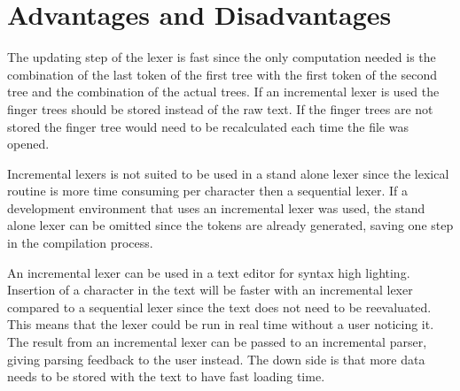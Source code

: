 \section{Advantages and Disadvantages}
The updating step of the lexer is fast since the only computation needed is the
combination of the last token of the first tree with the first token of the
second tree and the combination of the actual trees. If an incremental lexer is
used the finger trees should be stored instead of the raw text. If the finger
trees are not stored the finger tree would need to be recalculated each time the
file was opened.

Incremental lexers is not suited to be used in a stand alone lexer since the
lexical routine is more time consuming per character then a sequential lexer. If
a development environment that uses an incremental lexer was used, the stand
alone lexer can be omitted since the tokens are already generated, saving one
step in the compilation process.

An incremental lexer can be used in a text editor for syntax high lighting.
Insertion of a character in the text will be faster with an incremental lexer
compared to a sequential lexer since the text does not need to be reevaluated.
This means that the lexer could be run in real time without a user noticing it.
The result from an incremental lexer can be passed to an incremental parser,
giving parsing feedback to the user instead. The down side is that more data
needs to be stored with the text to have fast loading time.
